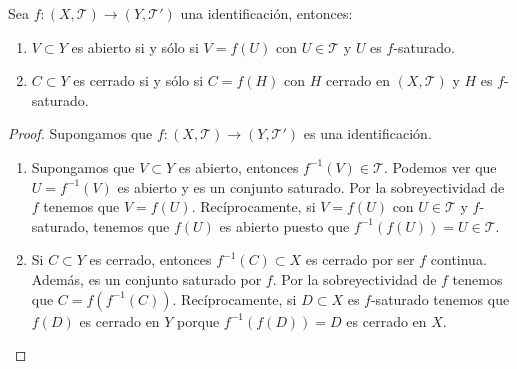 \begin{prop}
Sea $\displaystyle f : \left(X, \mathcal{T}\right)\to \left(Y, \mathcal{T}'\right) $ una identificación, entonces:
\begin{enumerate}
\item $\displaystyle V \subset Y $ es abierto si y sólo si $\displaystyle V = f\left(U\right) $ con $\displaystyle U \in \mathcal{T} $ y $\displaystyle U $ es $\displaystyle f $-saturado.
\item $\displaystyle C \subset Y $ es cerrado si y sólo si $\displaystyle C = f\left(H\right) $ con $\displaystyle H $ cerrado en $\displaystyle \left(X, \mathcal{T}\right) $ y $\displaystyle H $ es $\displaystyle f $-saturado.
\end{enumerate}
\end{prop}
\begin{proof}
Supongamos que $\displaystyle f : \left(X, \mathcal{T}\right)\to \left(Y, \mathcal{T}'\right) $ es una identificación.
\begin{enumerate}
\item Supongamos que $\displaystyle V \subset Y $ es abierto, entonces $\displaystyle f^{-1}\left(V\right)\in \mathcal{T}$. Podemos ver que $\displaystyle U = f^{-1}\left(V\right) $ es abierto y es un conjunto saturado. Por la sobreyectividad de $\displaystyle f $ tenemos que $\displaystyle V = f\left(U\right) $. Recíprocamente, si $\displaystyle V = f\left(U\right) $ con $\displaystyle U \in \mathcal{T} $ y $\displaystyle f $-saturado, tenemos que $\displaystyle f\left(U\right) $ es abierto puesto que $\displaystyle f^{-1}\left(f\left(U\right)\right)=U \in \mathcal{T} $. 
\item Si $\displaystyle C \subset Y $ es cerrado, entonces $\displaystyle f^{-1}\left(C\right)\subset X $ es cerrado por ser $\displaystyle f $ continua. Además, es un conjunto saturado por $\displaystyle f $. Por la sobreyectividad de $\displaystyle f $ tenemos que $\displaystyle C = f\left(f^{-1}\left(C\right)\right) $. Recíprocamente, si $\displaystyle D \subset X $ es $\displaystyle f $-saturado tenemos que $\displaystyle f\left(D\right) $ es cerrado en $\displaystyle Y $ porque $\displaystyle f^{-1}\left(f\left(D\right)\right)=D $ es cerrado en $\displaystyle X $. 
\end{enumerate}
\end{proof}
